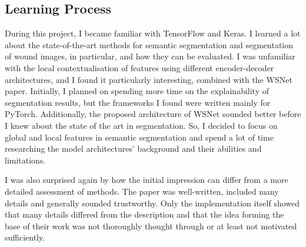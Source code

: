 \subsection{Learning Process}

During this project, I became familiar with TensorFlow and Keras. I learned a lot about the state-of-the-art methods for semantic segmentation and segmentation of wound images, in particular, and how they can be evaluated. I was unfamiliar with the local contextualisation of features using different encoder-decoder architectures, and I found it particularly interesting, combined with the WSNet paper. Initially, I planned on spending more time on the explainability of segmentation results, but the frameworks I found were written mainly for PyTorch. Additionally, the proposed architecture of WSNet sounded better before I knew about the state of the art in segmentation. So, I decided to focus on global and local features in semantic segmentation and spend a lot of time researching the model architectures' background and their abilities and limitations.

I was also surprised again by how the initial impression can differ from a more detailed assessment of methods. The paper was well-written, included many details and generally sounded trustworthy. Only the implementation itself showed that many details differed from the description and that the idea forming the base of their work was not thoroughly thought through or at least not motivated sufficiently.
